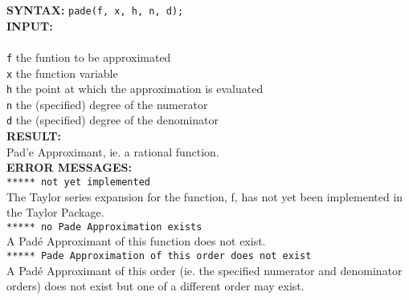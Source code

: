 \hypertarget{PADE:operator}{}

\textbf{SYNTAX:} \hspace{5mm} \texttt{pade(f, x, h, n, d);}\\[\baselineskip]

\textbf{INPUT:}\\\\
\texttt{f} \hspace{6mm} the funtion to be approximated\\
\texttt{x} \hspace{6mm} the function variable\\
\texttt{h} \hspace{6mm} the point at which the approximation is evaluated\\
\texttt{n} \hspace{6mm} the (specified) degree of the numerator\\
\texttt{d} \hspace{6mm} the (specified) degree of the denominator\\[\baselineskip]
\textbf{RESULT:} \\
Pad\a'{e} Approximant, ie. a rational function.\\[\baselineskip]

\textbf{ERROR MESSAGES:}\\

 \hspace{6mm} \texttt{***** not yet implemented}\\

The Taylor series expansion for the function, f, has not yet
been implemented in the {\REDUCE} Taylor Package.\\[\baselineskip]

 \hspace{6mm} \texttt{***** no Pade Approximation exists}\\

A Pad\'{e} Approximant of this function does not exist.\\[\baselineskip]

 \hspace{6mm} \texttt{***** Pade Approximation of this order does not exist}\\

A Pad\'{e} Approximant of this order (ie. the specified
numerator and denominator orders) does not exist but one
of a different order may exist.\\[\baselineskip]

